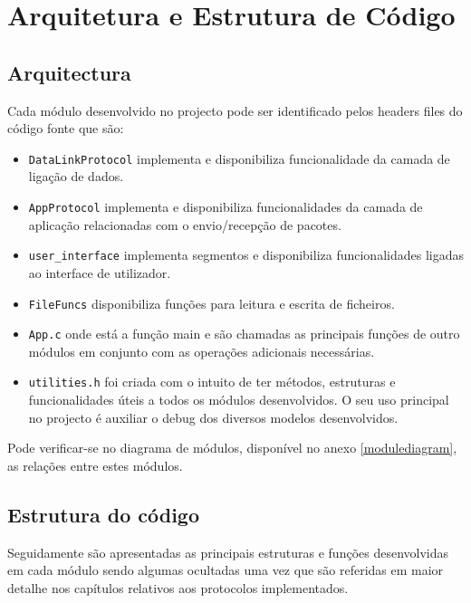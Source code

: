 \documentclass[11pt,a4paper,reqno]{report}
\numberwithin{equation}{section}
\begin{document}
	
\chapter{Arquitetura e Estrutura de Código}

\section{Arquitectura}

Cada módulo desenvolvido no projecto pode ser identificado pelos headers files do código fonte que são:
\begin{itemize}
\item \verb|DataLinkProtocol| implementa e disponibiliza funcionalidade da camada de ligação de dados. 
\item \verb|AppProtocol|  implementa e disponibiliza funcionalidades da camada de aplicação relacionadas com o envio/recepção de pacotes.
\item \verb|user_interface| implementa segmentos e disponibiliza funcionalidades ligadas ao interface de utilizador. 
\item \verb|FileFuncs| disponibiliza funções para leitura e escrita de ficheiros. 
\item \verb|App.c| onde está a função main e são chamadas as principais funções de outro módulos em conjunto com as operações adicionais necessárias. 
\item \verb|utilities.h| foi criada com o intuito de ter métodos, estruturas e funcionalidades úteis a todos os módulos desenvolvidos. O seu uso principal no projecto é auxiliar o debug dos diversos modelos desenvolvidos.
\end{itemize}
Pode verificar-se no diagrama de módulos, disponível no anexo \ref{modulediagram}, as relações entre estes módulos.

\section{Estrutura do código}

Seguidamente são apresentadas as principais estruturas e funções desenvolvidas em cada módulo sendo algumas ocultadas uma vez que são referidas em maior detalhe nos capítulos relativos aos protocolos implementados.
\end{document}
